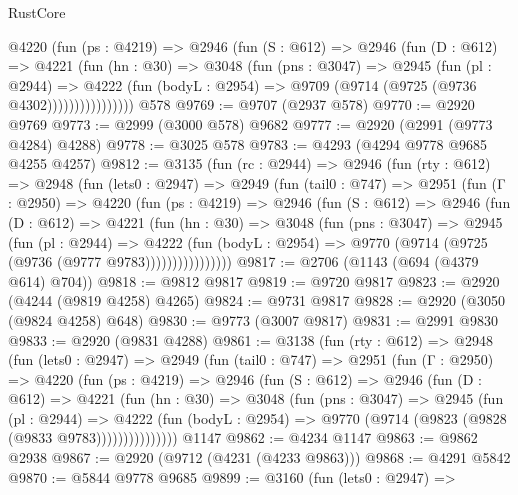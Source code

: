 \begin{lexlean}{RustCore}
\begin{coremodule}
              @4220
                (fun (ps : @4219) =>
                @2946
                  (fun (S : @612) =>
                  @2946
                    (fun (D : @612) =>
                    @4221
                      (fun (hn : @30) =>
                      @3048
                        (fun (pns : @3047) =>
                        @2945
                          (fun (pl : @2944) =>
                          @4222
                            (fun (bodyL : @2954) => @9709 (@9714 (@9725 (@9736 @4302))))))))))))))))
    @578
@9769 := @9707 (@2937 @578)
@9770 := @2920 @9769
@9773 := @2999 (@3000 @578) @9682
@9777 := @2920 (@2991 (@9773 @4284) @4288)
@9778 := @3025 @578
@9783 := @4293 (@4294 @9778 @9685 @4255 @4257)
@9812 := @3135
    (fun (rc : @2944) =>
    @2946
      (fun (rty : @612) =>
      @2948
        (fun (lets0 : @2947) =>
        @2949
          (fun (tail0 : @747) =>
          @2951
            (fun (Γ : @2950) =>
            @4220
              (fun (ps : @4219) =>
              @2946
                (fun (S : @612) =>
                @2946
                  (fun (D : @612) =>
                  @4221
                    (fun (hn : @30) =>
                    @3048
                      (fun (pns : @3047) =>
                      @2945
                        (fun (pl : @2944) =>
                        @4222
                          (fun (bodyL : @2954) =>
                          @9770 (@9714 (@9725 (@9736 (@9777 @9783))))))))))))))))
@9817 := @2706 (@1143 (@694 (@4379 @614) @704))
@9818 := @9812 @9817
@9819 := @9720 @9817
@9823 := @2920 (@4244 (@9819 @4258) @4265)
@9824 := @9731 @9817
@9828 := @2920 (@3050 (@9824 @4258) @648)
@9830 := @9773 (@3007 @9817)
@9831 := @2991 @9830
@9833 := @2920 (@9831 @4288)
@9861 := @3138
    (fun (rty : @612) =>
    @2948
      (fun (lets0 : @2947) =>
      @2949
        (fun (tail0 : @747) =>
        @2951
          (fun (Γ : @2950) =>
          @4220
            (fun (ps : @4219) =>
            @2946
              (fun (S : @612) =>
              @2946
                (fun (D : @612) =>
                @4221
                  (fun (hn : @30) =>
                  @3048
                    (fun (pns : @3047) =>
                    @2945
                      (fun (pl : @2944) =>
                      @4222
                        (fun (bodyL : @2954) =>
                        @9770 (@9714 (@9823 (@9828 (@9833 @9783)))))))))))))))
    @1147
@9862 := @4234 @1147
@9863 := @9862 @2938
@9867 := @2920 (@9712 (@4231 (@4233 @9863)))
@9868 := @4291 @5842
@9870 := @5844 @9778 @9685
@9899 := @3160
    (fun (lets0 : @2947) =>

\end{coremodule}
\end{lexlean}
